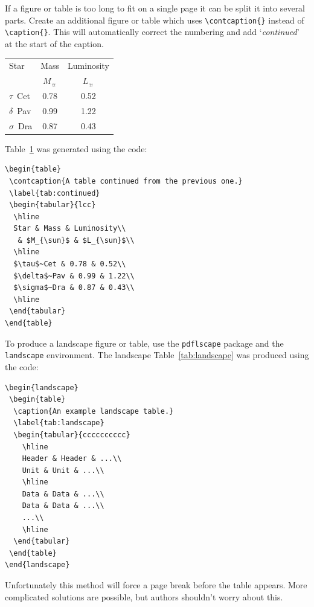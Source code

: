 \documentclass[fleqn,usenatbib,useAMS]{rasti}
\begin{document}
If a figure or table is too long to fit on a single page it can be split it into several parts.
Create an additional figure or table which uses \verb'\contcaption{}' instead of \verb'\caption{}'.
This will automatically correct the numbering and add `\emph{continued}' at the start of the caption.
\begin{table}
 \label{tab:continued}
 \begin{tabular}{lcc}
  \hline
  Star & Mass & Luminosity\\
   & $M_{\sun}$ & $L_{\sun}$\\
  \hline
  $\tau$~Cet & 0.78 & 0.52\\
  $\delta$~Pav & 0.99 & 1.22\\
  $\sigma$~Dra & 0.87 & 0.43\\
  \hline
 \end{tabular}
\end{table}
Table~\ref{tab:continued} was generated using the code:

\begin{verbatim}
\begin{table}
 \contcaption{A table continued from the previous one.}
 \label{tab:continued}
 \begin{tabular}{lcc}
  \hline
  Star & Mass & Luminosity\\
   & $M_{\sun}$ & $L_{\sun}$\\
  \hline
  $\tau$~Cet & 0.78 & 0.52\\
  $\delta$~Pav & 0.99 & 1.22\\
  $\sigma$~Dra & 0.87 & 0.43\\
  \hline
 \end{tabular}
\end{table}
\end{verbatim}

To produce a landscape figure or table, use the \verb'pdflscape' package and the \verb'landscape' environment.
The landscape Table~\ref{tab:landscape} was produced using the code:
\begin{verbatim}
\begin{landscape}
 \begin{table}
  \caption{An example landscape table.}
  \label{tab:landscape}
  \begin{tabular}{cccccccccc}
    \hline
    Header & Header & ...\\
    Unit & Unit & ...\\
    \hline
    Data & Data & ...\\
    Data & Data & ...\\
    ...\\
    \hline
  \end{tabular}
 \end{table}
\end{landscape}
\end{verbatim}
Unfortunately this method will force a page break before the table appears.
More complicated solutions are possible, but authors shouldn't worry about this.
\end{document}
